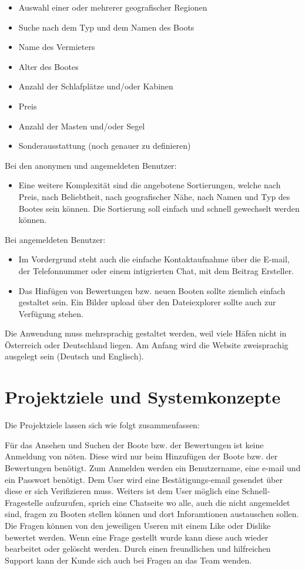 \documentclass[12pt]{article}
\theoremstyle{definition}
\begin{document}
\begin{itemize}
   \item Auswahl einer oder mehrerer geografischer Regionen
   \item Suche nach dem Typ und dem Namen des Boots
   \item Name des Vermieters
   \item Alter des Bootes
   \item Anzahl der Schlafplätze und/oder Kabinen
   \item Preis
   \item Anzahl der Masten und/oder Segel
   \item Sonderausstattung (noch genauer zu definieren)
\end{itemize}

Bei den anonymen und angemeldeten Benutzer:
\begin{itemize}
   \item Eine weitere Komplexität sind die angebotene Sortierungen, welche nach Preis, nach Beliebtheit, nach geografischer Nähe, nach Namen und Typ des Bootes sein können. Die Sortierung soll einfach und schnell gewechselt werden können.
\end{itemize}

Bei angemeldeten Benutzer:

\begin{itemize}
   \item Im Vordergrund steht auch die einfache Kontaktaufnahme über die E-mail, der Telefonnummer oder einem intigrierten Chat, mit dem Beitrag Ersteller.

   \item Das Hinfügen von Bewertungen bzw. neuen Booten sollte ziemlich einfach gestaltet sein. Ein Bilder upload über den Dateiexplorer sollte auch zur Verfügung stehen.
\end{itemize}


Die Anwendung muss mehrsprachig gestaltet werden, weil viele Häfen nicht in Österreich oder Deutschland liegen. Am Anfang wird die Website zweisprachig ausgelegt sein (Deutsch und Englisch).

\pagebreak

\section{Projektziele und Systemkonzepte}
Die Projektziele lassen sich wie folgt zusammenfassen:

Für das Ansehen und Suchen der Boote bzw. der Bewertungen ist keine Anmeldung von nöten. Diese wird nur beim Hinzufügen der Boote bzw. der Bewertungen benötigt.
Zum Anmelden werden ein Benutzername, eine e-mail und ein Passwort benötigt. Dem User wird eine Bestätigungs-email gesendet über diese er sich Verifizieren muss. 
Weiters ist dem User möglich eine Schnell-Fragestelle aufzurufen, sprich eine Chatseite wo alle, auch die nicht angemeldet sind, fragen zu Booten stellen können und dort Inforamtionen austauschen sollen. Die Fragen können von den jeweiligen Useren mit einem Like oder Dislike bewertet werden. Wenn eine Frage gestellt wurde kann diese auch wieder bearbeitet oder gelöscht werden.
Durch einen freundlichen und hilfreichen Support kann der Kunde sich auch bei Fragen an das Team wenden.
\end{document}
